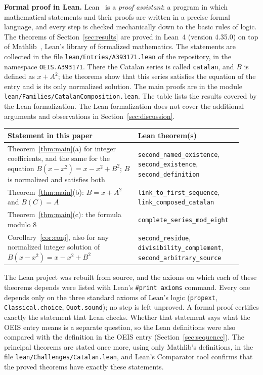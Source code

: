 \documentclass[11pt,a4paper]{article}
\theoremstyle{definition}
\theoremstyle{remark}
\newcommand{\para}[1]{\par\medskip\noindent\textbf{#1}\enspace}
\begin{document}
\para{Formal proof in Lean.}
Lean~\cite{lean} is a \emph{proof assistant}: a program in which mathematical statements and their proofs are written
in a precise formal language, and every step is checked mechanically down to the basic rules of logic. The theorems of Section~\ref{sec:results} are proved in Lean~4 (version 4.35.0) on top of
Mathlib~\cite{mathlib}, Lean's library of formalized mathematics. The statements are collected in the file \texttt{lean/Entries/A393171.lean} of the repository,
in the namespace \texttt{OEIS.A393171}. There the Catalan series is called \texttt{catalan}, and $B$ is defined as $x+A^2$; the theorems show that this series satisfies the equation of the entry and is its only normalized solution. The main proofs are in the module \texttt{lean/Families/CatalanComposition.lean}.
The table lists the results covered by the Lean formalization. The Lean formalization does not cover the additional arguments and observations in Section~\ref{sec:discussion}.
\begin{center}\small\renewcommand{\arraystretch}{1.25}
\begin{tabular}{>{\raggedright\arraybackslash}p{0.52\linewidth}>{\raggedright\arraybackslash}p{0.4\linewidth}}
\toprule
Statement in this paper & Lean theorem(s)\\
\midrule
Theorem~\ref{thm:main}(a) for integer coefficients, and the same for the equation $B(x-x^2)=x-x^2+B^2$; $B$ is normalized and satisfies both & \texttt{second\_\allowbreak{}named\_\allowbreak{}existence}, \texttt{second\_\allowbreak{}existence}, \texttt{second\_\allowbreak{}definition} \\
Theorem~\ref{thm:main}(b): $B=x+A^2$ and $B(C)=A$ & \texttt{link\_\allowbreak{}to\_\allowbreak{}first\_\allowbreak{}sequence}, \texttt{link\_\allowbreak{}composed\_\allowbreak{}catalan} \\
Theorem~\ref{thm:main}(c): the formula modulo $8$ & \texttt{complete\_\allowbreak{}series\_\allowbreak{}mod\_\allowbreak{}eight} \\
Corollary~\ref{cor:conj}, also for any normalized integer solution of $B(x-x^2)=x-x^2+B^2$ & \texttt{second\_\allowbreak{}residue}, \texttt{divisibility\_\allowbreak{}complement}, \texttt{second\_\allowbreak{}arbitrary\_\allowbreak{}source} \\
\bottomrule
\end{tabular}
\end{center}
The Lean project was rebuilt from source, and the axioms on which each of these theorems depends were listed with
Lean's \texttt{\#print axioms} command. Every one depends only on the three standard axioms of Lean's logic
(\texttt{propext}, \texttt{Classical.choice}, \texttt{Quot.sound}); no step is left unproved. A formal proof certifies
exactly the statement that Lean checks. Whether that statement says what the OEIS entry means is a separate question,
so the Lean definitions were also compared with the definition in the OEIS entry
(Section~\ref{sec:sequence}). The principal theorems are stated once more, using only Mathlib's definitions, in the
file \texttt{lean/Challenges/Catalan.lean}, and Lean's Comparator tool confirms that the
proved theorems have exactly these statements.
\end{document}
